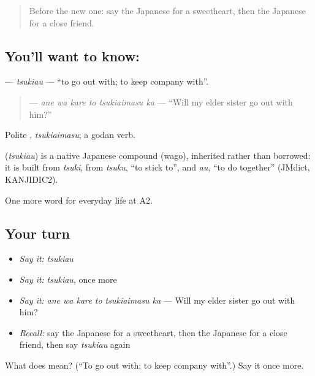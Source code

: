\begin{quote}
Before the new one: say the Japanese for a sweetheart, then the Japanese for a close friend.
\end{quote}

\subsection*{You'll want to know: }
\textbf{} — \emph{tsukiau} — \textquotedblleft{}to go out with; to keep company with\textquotedblright{}.

\begin{quote}
\textbf{  } — \emph{ane wa kare to tsukiaimasu ka} — \textquotedblleft{}Will my elder sister go out with him?\textquotedblright{}
\end{quote}

Polite \textbf{}, \emph{tsukiaimasu}; a godan verb.

\begin{cousinweb}
\textbf{} (\emph{tsukiau}) is a native Japanese compound (wago), inherited rather than borrowed: it is built from \emph{tsuki}, from \emph{tsuku}, \textquotedblleft{}to stick to\textquotedblright{}, and \emph{au}, \textquotedblleft{}to do together\textquotedblright{} (JMdict, KANJIDIC2).
\end{cousinweb}

\begin{grammarlens}[title={What you've built}]
One more word for everyday life at A2.
\end{grammarlens}

\subsection*{Your turn}
\begin{itemize}
\raggedright
  \item \emph{Say it:} \emph{tsukiau}
  \item \emph{Say it:} \emph{tsukiau}, once more
  \item \emph{Say it:} \emph{ane wa kare to tsukiaimasu ka} — Will my elder sister go out with him?
  \item \emph{Recall:} say the Japanese for a sweetheart, then the Japanese for a close friend, then say \emph{tsukiau} again
\end{itemize}

\begin{tcolorbox}[breakable,colback=teal!4,colframe=teal!35!black,title={Before you move on}]
What does  mean? (\textquotedblleft{}To go out with; to keep company with\textquotedblright{}.) Say it once more.
\end{tcolorbox}
